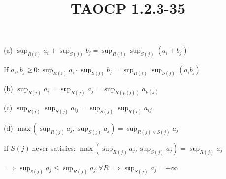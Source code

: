 \documentclass{article}
\title{TAOCP 1.2.3\mbox{-}35}
\begin{document}
\maketitle

(a) \( \sup_{R(i)}a_{i} + \sup_{S(j)}b_{j} = \sup_{R(i)}\sup_{S(j)}(a_{i} + b_{j}) \)

If \( a_{i}, b_{j} \geq 0: \sup_{R(i)}a_{i} \cdot \sup_{S(j)}b_{j} = \sup_{R(i)}\sup_{S(j)}(a_{i}b_{j}) \)

(b) \( \sup_{R(i)} a_{i} = \sup_{R(j)} a_{j} = \sup_{R(p(j))} a_{p(j)} \)

(c) \( \sup_{R(i)}\sup_{S(j)} a_{ij} = \sup_{S(j)} \sup_{R(i)} a_{ij} \)

(d) \( \max(\sup_{R(j)} a_{j}, \sup_{S(j)} a_{j} ) = \sup_{R(j) \lor S(j)} a_{j} \)

If \( S(j) \) never satisfies: \( \max(\sup_{R(j)} a_{j}, \sup_{S(j)} a_{j} ) = \sup_{R(j)} a_{j} \)

\( \implies \sup_{S(j)} a_{j} \leq \sup_{R(j)} a_{j}, \forall R \implies \sup_{S(j)} a_{j} = -\infty \)
\end{document}
